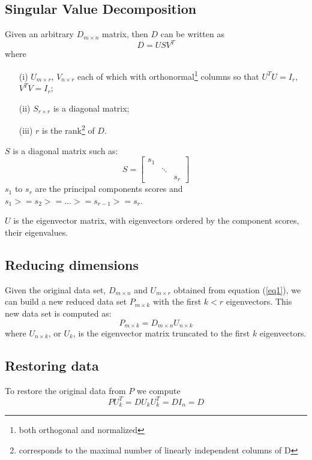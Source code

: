 \documentclass{article} %
\begin{document}
\subsection{Singular Value Decomposition}
Given an arbitrary $D_{m\times n}$ matrix, then $D$ can be written as 
\begin{equation} \label{eq1}
D=USV^T
\end{equation}
where
\begin{enumerate}
\item[(i)] $U_{m\times r}$, $V_{n\times r}$ each of which with orthonormal\footnote{both orthogonal and normalized} columns so that $U^TU=I_{r}$, $V^TV=I_{r}$;
\item[(ii)] $S_{r\times r}$ is a diagonal matrix;
\item[(iii)] $r$ is the rank\footnote{corresponds to the maximal number of linearly independent columns of D} of $D$.
\end{enumerate}
$S$ is a diagonal matrix such as:
\[
  S =
  \begin{bmatrix}
    s_{1} & & \\
    & \ddots & \\
    & & s_{r}
  \end{bmatrix}
\]
$s_{1}$ to $s_{r}$ are the principal components scores and $s_{1} >= s_{2} >= ... >= s_{r-1} >= s_{r}$.\par
$U$ is the eigenvector matrix, with eigenvectors ordered by the component scores, their eigenvalues.
\subsection{Reducing dimensions}
Given the original data set, $D_{m\times n}$ and $U_{m\times r}$ obtained from equation (\ref{eq1}), we can build a new reduced data set $P_{m\times k}$ with the first $k<r$ eigenvectors. This new data set is computed as:
\begin{equation}
P_{m\times k} = D_{m\times n} U_{n\times k}
\end{equation}
where $U_{n\times k}$, or $U_k$, is the eigenvector matrix truncated to the first $k$ eigenvectors.
\subsection{Restoring data}
To restore the original data from $P$ we compute \[PU_{k}^T = DU_{k}U_{k}^T = DI_{n} = D\]
\end{document}
